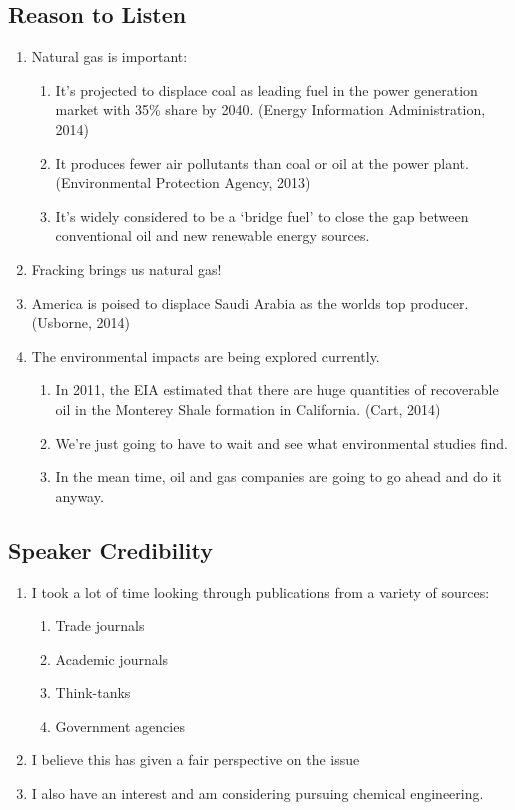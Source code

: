 \documentclass{article}
\begin{document}
  \subsection{Reason to Listen}
    \begin{enumerate}
      \item Natural gas is important:
        \begin{enumerate}
          \item It's projected to displace coal as leading fuel in the power generation market with 35\% share by 2040. (Energy Information Administration, 2014)
          \item It produces fewer air pollutants than coal or oil at the power plant. (Environmental Protection Agency, 2013)
          \item It's widely considered to be a `bridge fuel' to close the gap between conventional oil and new renewable energy sources.
        \end{enumerate}
      \item Fracking brings us natural gas!
      \item America is poised to displace Saudi Arabia as the worlds top producer. (Usborne, 2014)
      \item The environmental impacts are being explored currently.
        \begin{enumerate}
          \item In 2011, the EIA estimated that there are huge quantities of recoverable oil in the Monterey Shale formation in California. (Cart, 2014)
          \item We're just going to have to wait and see what environmental studies find.
          \item In the mean time, oil and gas companies are going to go ahead and do it anyway.
        \end{enumerate}
    \end{enumerate}
  \subsection{Speaker Credibility}
    \begin{enumerate}
      \item I took a lot of time looking through publications from a variety of sources:
        \begin{enumerate}
          \item Trade journals
          \item Academic journals
          \item Think-tanks
          \item Government agencies
        \end{enumerate}
      \item I believe this has given a fair perspective on the issue
      \item I also have an interest and am considering pursuing chemical engineering.
    \end{enumerate}
\end{document}
